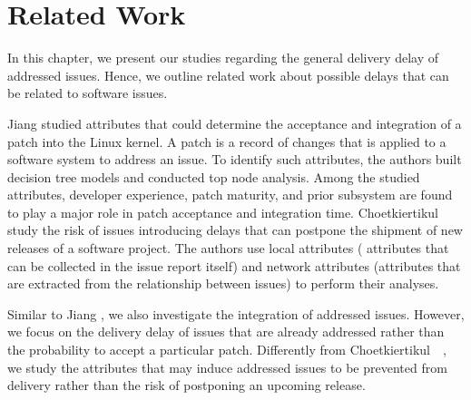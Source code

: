 \section{Related Work} \label{ch4:relatedwork}

In this chapter, we present our studies regarding the general delivery delay of
addressed issues. Hence, we outline related work about possible delays that can
be related to software issues.

Jiang \etal \cite{Jiang2013} studied attributes that could determine the
acceptance and integration of a patch into the Linux kernel. A patch is a record
of changes that is applied to a software system to address an issue. To identify
such attributes, the authors built decision tree models and conducted top node
analysis. Among the studied attributes, developer experience, patch maturity,
and prior subsystem are found to play a major role in patch acceptance and
integration time. Choetkiertikul~\etal~\cite{riskyissues2015a,riskyissues2015b}
study the risk of issues introducing delays that can postpone the shipment of
new releases of a software project. The authors use local attributes (\ie
attributes that can be collected in the issue report itself) and network
attributes (\ie attributes that are extracted from the relationship between
issues) to perform their analyses.

Similar to Jiang \etal\cite{Jiang2013}, we also investigate the integration of
addressed issues.  However, we focus on the delivery delay of issues that are
already addressed rather than the probability to accept a particular patch.
Differently from Choetkiertikul~\etal~\cite{riskyissues2015a,riskyissues2015b},
we study the attributes that may induce addressed issues to be prevented from
delivery rather than the risk of postponing an upcoming release.

